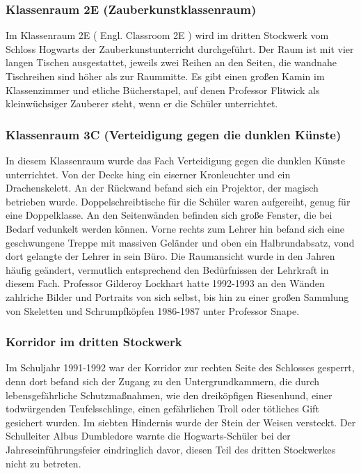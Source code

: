 \documentclass[a4paper, 10pt]{article}
\begin{document}
\subsubsection*{\large Klassenraum 2E (Zauberkunstklassenraum)}
Im Klassenraum 2E (  Engl.  Classroom 2E ) wird im dritten Stockwerk vom Schloss Hogwarts der Zauberkunstunterricht durchgeführt. Der Raum ist mit vier langen Tischen ausgestattet, jeweils zwei Reihen an den Seiten, die wandnahe Tischreihen sind höher als zur Raummitte. Es gibt einen großen Kamin im Klassenzimmer und etliche Bücherstapel, auf denen Professor Flitwick als kleinwüchsiger Zauberer steht, wenn er die Schüler unterrichtet.
\subsubsection*{\large Klassenraum 3C (Verteidigung gegen die dunklen Künste)}
In diesem Klassenraum wurde das Fach Verteidigung gegen die dunklen Künste unterrichtet. Von der Decke hing ein eiserner Kronleuchter und ein Drachenskelett. An der Rückwand befand sich ein Projektor, der magisch betrieben wurde. Doppelschreibtische für die Schüler waren aufgereiht, genug für eine Doppelklasse. An den Seitenwänden befinden sich große Fenster, die bei Bedarf vedunkelt werden können. Vorne rechts zum Lehrer hin befand sich eine geschwungene Treppe mit massiven Geländer und oben ein Halbrundabsatz, vond dort gelangte der Lehrer in sein Büro.
\vspace{10pt}
\newline
{}  
Die Raumansicht wurde in den Jahren häufig geändert, vermutlich entsprechend den Bedürfnissen der Lehrkraft in diesem Fach. Professor Gilderoy Lockhart hatte 1992-1993 an den Wänden zahlriche Bilder und Portraits von sich selbst, bis hin zu einer großen Sammlung von Skeletten und Schrumpfköpfen 1986-1987 unter Professor Snape.
\subsubsection*{\large Korridor im dritten Stockwerk}
Im Schuljahr 1991-1992 war der Korridor zur rechten Seite des Schlosses gesperrt, denn dort befand sich der Zugang zu den Untergrundkammern, die durch lebensgefährliche Schutzmaßnahmen, wie den dreiköpfigen Riesenhund, einer todwürgenden Teufelsschlinge, einen gefährlichen Troll oder tötliches Gift gesichert wurden. Im siebten Hindernis wurde der Stein der Weisen versteckt. Der Schulleiter Albus Dumbledore warnte die Hogwarts-Schüler bei der Jahreseinführungsfeier eindringlich davor, diesen Teil des dritten Stockwerkes nicht zu betreten.
\end{document}
